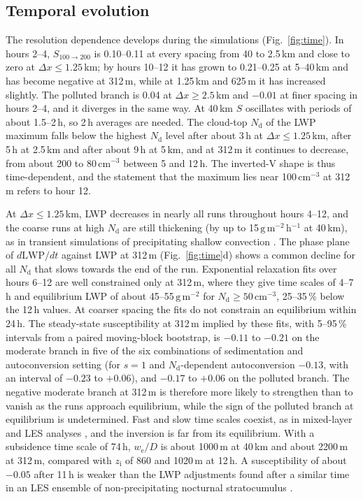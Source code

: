 \documentclass[acp, manuscript]{copernicus}
\newcommand{\Nd}{N_\mathrm{d}}
\newcommand{\LWP}{\mathrm{LWP}}
\newcommand{\we}{w_\mathrm{e}}
\newcommand{\zi}{z_\mathrm{i}}
\newcommand{\dx}{\Delta x}
\newcommand{\Shigh}{S_{100\rightarrow200}}
\newcommand{\cmthree}{\mathrm{cm^{-3}}}
\newcommand{\gmm}{\mathrm{g\,m^{-2}}}
\begin{document}
\subsection{Temporal evolution}\label{sec:time}

The resolution dependence develops during the simulations (Fig.~\ref{fig:time}). In hours 2--4, $\Shigh$ is 0.10--0.11 at every spacing from 40 to 2.5\,km and close to zero at $\dx\leq1.25$\,km; by hours 10--12 it has grown to 0.21--0.25 at 5--40\,km and has become negative at 312\,m, while at 1.25\,km and 625\,m it has increased slightly. The polluted branch is 0.04 at $\dx\geq2.5$\,km and $-0.01$ at finer spacing in hours 2--4, and it diverges in the same way. At 40\,km $S$ oscillates with periods of about 1.5--2\,h, so 2\,h averages are needed. The cloud-top $\Nd$ of the LWP maximum falls below the highest $\Nd$ level after about 3\,h at $\dx\leq1.25$\,km, after 5\,h at 2.5\,km and after about 9\,h at 5\,km, and at 312\,m it continues to decrease, from about 200 to 80\,$\cmthree$ between 5 and 12\,h. The inverted-V shape is thus time-dependent, and the statement that the maximum lies near 100\,$\cmthree$ at 312\,m refers to hour 12.

At $\dx\leq1.25$\,km, LWP decreases in nearly all runs throughout hours 4--12, and the coarse runs at high $\Nd$ are still thickening (by up to 15\,$\gmm$\,h$^{-1}$ at 40\,km), as in transient simulations of precipitating shallow convection \citep{seifert2015}. The phase plane of $d\LWP/dt$ against LWP at 312\,m (Fig.~\ref{fig:time}d) shows a common decline for all $\Nd$ that slows towards the end of the run. Exponential relaxation fits over hours 6--12 are well constrained only at 312\,m, where they give time scales of 4--7\,h and equilibrium LWP of about 45--55\,$\gmm$ for $\Nd\geq50\,\cmthree$, 25--35\,\% below the 12\,h values. At coarser spacing the fits do not constrain an equilibrium within 24\,h. The steady-state susceptibility at 312\,m implied by these fits, with 5--95\,\% intervals from a paired moving-block bootstrap, is $-0.11$ to $-0.21$ on the moderate branch in five of the six combinations of sedimentation and autoconversion setting (for $s=1$ and $\Nd$-dependent autoconversion $-0.13$, with an interval of $-0.23$ to $+0.06$), and $-0.17$ to $+0.06$ on the polluted branch. The negative moderate branch at 312\,m is therefore more likely to strengthen than to vanish as the runs approach equilibrium, while the sign of the polluted branch at equilibrium is undetermined. Fast and slow time scales coexist, as in mixed-layer and LES analyses \citep{bretherton2010,jones2014}, and the inversion is far from its equilibrium. With a subsidence time scale of 74\,h, $\we/D$ is about 1000\,m at 40\,km and about 2200\,m at 312\,m, compared with $\zi$ of 860 and 1020\,m at 12\,h. A susceptibility of about $-0.05$ after 11\,h is weaker than the LWP adjustments found after a similar time in an LES ensemble of non-precipitating nocturnal stratocumulus \citep{chen2025}.
\end{document}
